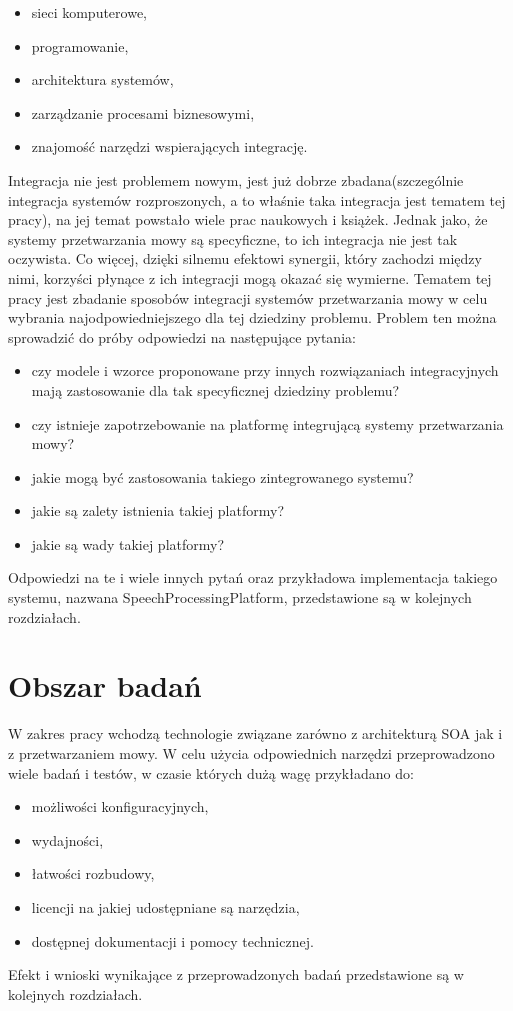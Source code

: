  \begin{itemize}
	\item sieci komputerowe,
	\item programowanie,
	\item architektura systemów,
	\item zarządzanie procesami biznesowymi,
	\item znajomość narzędzi wspierających integrację.
\end{itemize}   
Integracja nie jest problemem nowym, jest już dobrze zbadana(szczególnie integracja systemów rozproszonych, a to właśnie taka integracja jest tematem tej pracy), na jej temat powstało wiele prac naukowych i książek. Jednak jako, że systemy przetwarzania mowy są specyficzne, to ich integracja nie jest tak oczywista. Co więcej, dzięki silnemu efektowi synergii, który zachodzi między nimi, korzyści płynące z ich integracji mogą okazać się wymierne. Tematem tej pracy jest zbadanie sposobów integracji systemów przetwarzania mowy w celu wybrania najodpowiedniejszego dla tej dziedziny problemu. Problem ten można sprowadzić do próby odpowiedzi na następujące pytania:
 \begin{itemize}
	\item  czy modele i wzorce proponowane przy innych rozwiązaniach integracyjnych mają zastosowanie dla tak specyficznej dziedziny problemu?
	\item czy istnieje zapotrzebowanie na platformę integrującą systemy przetwarzania mowy?
	\item jakie mogą być zastosowania takiego zintegrowanego systemu?
	\item jakie są zalety istnienia takiej platformy?
	\item jakie są wady takiej platformy?
\end{itemize}  
Odpowiedzi na te i wiele innych pytań oraz przykładowa implementacja takiego systemu, nazwana SpeechProcessingPlatform,  przedstawione są w kolejnych rozdziałach.

\section{Obszar badań} %
W zakres pracy wchodzą technologie związane zarówno z architekturą SOA jak i z przetwarzaniem mowy. W celu użycia odpowiednich narzędzi przeprowadzono wiele badań i testów, w czasie których dużą wagę przykładano do:
\begin{itemize}
 	\item możliwości konfiguracyjnych,
	\item wydajności,
	\item łatwości rozbudowy,
	\item licencji na jakiej udostępniane są narzędzia,
	\item dostępnej dokumentacji i pomocy technicznej.
\end{itemize}
Efekt i wnioski wynikające z przeprowadzonych badań przedstawione są w kolejnych rozdziałach.

